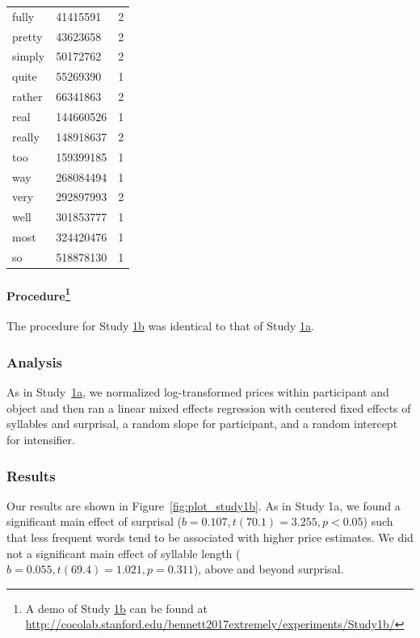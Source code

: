 \documentclass[10pt,letterpaper]{article}
\begin{document}
\begin{table}[ht]
\begin{center}
\begin{tabular}{llc}
    fully & 41415591 & 2 \\ 
    pretty & 43623658 & 2 \\ 
    simply & 50172762 & 2 \\ 
    quite & 55269390 & 1 \\ 
    rather & 66341863 & 2 \\ 
    real & 144660526 & 1 \\ 
    really & 148918637 & 2 \\ 
    too & 159399185 & 1 \\ 
    way & 268084494 & 1 \\ 
    very & 292897993 & 2 \\ 
    well & 301853777 & 1 \\ 
    most & 324420476 & 1 \\ 
    so & 518878130 & 1
  \end{tabular}
 \end{center}
\end{table}

\paragraph{Procedure\footnote{A demo of Study \hyperref[sec:study1b]{1b} can be found at \url{http://cocolab.stanford.edu/bennett2017extremely/experiments/Study1b/}}}

The procedure for Study \hyperref[sec:study1b]{1b} was identical to that of Study \hyperref[sec:study1a]{1a}.


\subsubsection{Analysis}

As in Study~\hyperref[sec:study1a]{1a}, we normalized log-transformed prices within participant and object and then ran a linear mixed effects regression with centered fixed effects of syllables and surprisal, a random slope for participant, and a random intercept for intensifier.

\subsubsection{Results}

Our results are shown in Figure~\ref{fig:plot_study1b}. 
As in Study 1a, we found a significant main effect of surprisal ($b=0.107, t(70.1)=3.255, p<0.05$) such that less frequent words tend to be associated with higher price estimates.
We did not a significant main effect of syllable length ($b=0.055, t(69.4)=1.021, p=0.311$), above and beyond surprisal.
\end{document}
